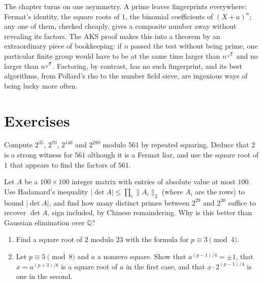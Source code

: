 \begin{beauty}
The chapter turns on one asymmetry. A prime leaves fingerprints everywhere: Fermat's identity, the square roots of $1$, the binomial coefficients of $(X+a)^n$; any one of them, checked cheaply, gives a composite number away without revealing its factors. The AKS proof makes this into a theorem by an extraordinary piece of bookkeeping: if $n$ passed the test without being prime,
one particular finite group would have to be at the same time larger than $n^{\sqrt t}$ and no larger than $n^{\sqrt t}$. Factoring, by contrast, has no such fingerprint, and its best algorithms, from Pollard's rho to the number field sieve, are ingenious ways of being lucky more often.
\end{beauty}

\section{Exercises}

\begin{exercise}[$\star$]\label{ex:powmod561}
Compute $2^{35}$, $2^{70}$, $2^{140}$ and $2^{280}$ modulo $561$ by repeated squaring. Deduce that $2$ is a strong witness for $561$ although it is a Fermat liar, and use the square root of $1$ that appears to find the factors of $561$.
\end{exercise}

\begin{exercise}[$\star\star$]\label{ex:crtdet}
Let $A$ be a $100\times100$ integer matrix with entries of absolute value at most $100$. Use Hadamard's inequality $|\det A|\le\prod_i\|A_i\|_2$ (where $A_i$ are the rows) to bound $|\det A|$, and find how many distinct primes between $2^{29}$ and $2^{30}$ suffice to recover $\det A$, sign included, by Chinese remaindering. Why is this better than Gaussian elimination over $\mathbb Q$?
\end{exercise}

\begin{exercise}[$\star$]\label{ex:sqrt34}
\begin{enumerate}[label=(\alph*)]
\item Find a square root of $2$ modulo $23$ with the formula for $p\equiv3\pmod4$.
\item Let $p\equiv5\pmod8$ and $a$ a nonzero square. Show that $a^{(p-1)/4}=\pm1$, that $x=a^{(p+3)/8}$ is a square root of $a$ in the first case, and that $x\cdot2^{(p-1)/4}$ is one in the second.
\end{enumerate}
\end{exercise}

